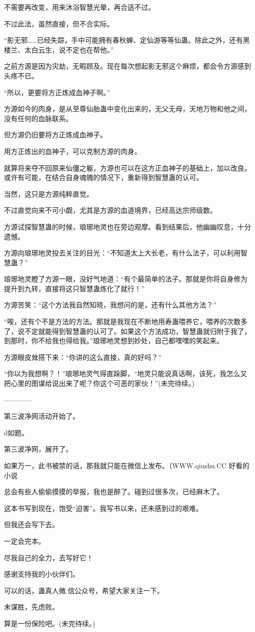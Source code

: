 \begin{this_body}
不需要再改变，用来沐浴智慧光晕，再合适不过。

不过此法，虽然直接，但不合实际。

“影无邪……已经失踪，手中可能拥有春秋蝉、定仙游等等仙蛊。除此之外，还有黑楼兰、太白云生，说不定也在帮他。”

之前方源是因为灾劫，无暇顾及。现在每次想起影无邪这个麻烦，都会令方源感到头疼不已。

“所以，更要将方正炼成血神子啊。”

方源如今的肉身，是从至尊仙胎蛊中变化出来的，无父无母，天地万物和他之间，没有任何的血脉联系。

但方源仍旧要将方正炼成血神子。

用方正炼出的血神子，可以克制方源的肉身。

就算将来夺不回原来仙僵之躯，方源也可以在这方正血神子的基础上，加以改良。或许有可能，在结合自身魂魄的情况下，重新得到智慧蛊的认可。

当然，这只是方源纯粹直觉。

不过直觉向来不可小觑，尤其是方源的血道境界，已经高达宗师级数。

方源试探智慧蛊的时候，琅琊地灵也在旁边观摩。看到结果后，他幽幽叹息，十分遗憾。

方源向琅琊地灵投去关注的目光：“不知道太上大长老，有什么法子，可以利用智慧蛊？”

琅琊地灵瞪了方源一眼，没好气地道：“有个最简单的法子。那就是你将自身修为提升到九转，直接将这只智慧蛊炼化了就行！”

方源苦笑：“这个方法我自然知晓，我想问的是，还有什么其他方法？”

“唉，还有个不是方法的方法。那就是我现在不断地用寿蛊喂养它，喂养的次数多了，说不定就能得到智慧蛊的认可了。如果这个方法成功，智慧蛊就归附于我了，到那时，你不给我也得给我。”琅琊地灵想到妙处，自己都嘿嘿的笑起来。

方源眼皮耸搭下来：“你讲的这么直接，真的好吗？”

“你以为我想啊？！”琅琊地灵气得直跺脚，“地灵只能说真话啊，该死，我怎么又把心里的图谋给说出来了呢？你这个可恶的家伙！”(未完待续。)

------------

第三波净网活动开始了。

d如题。

第三波净网，展开了。

如果万一，此书被禁的话，那我就只能在微信上发布。（WWW.qiushu.CC 好看的小说

总会有些人偷偷摸摸的举报，我也是醉了。碰到过很多次，已经麻木了。

这本书写到现在，饱受“迫害”。我写书以来，还未感到过的艰难。

但我还会写下去。

一定会完本。

尽我自己的全力，去写好它！

感谢支持我的小伙伴们。

可以的话，蛊真人微.信公众号，希望大家关注一下。

未谋胜，先虑败。

算是一份保险吧。(未完待续。)

\end{this_body}

